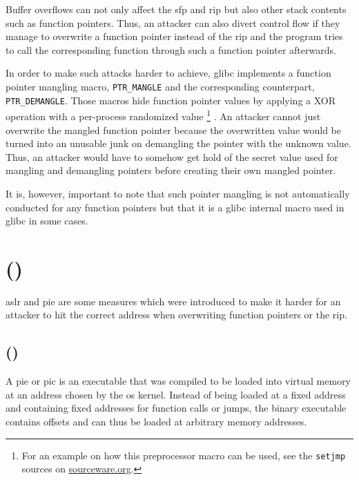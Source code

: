 Buffer overflows can not only affect the \acrfull{sfp} and \acrfull{rip} but also other stack contents such as function pointers.
Thus, an attacker can also divert control flow if they manage to overwrite a function pointer instead of the \gls{rip} and the program tries to call the corresponding function through such a function pointer afterwards.

In order to make such attacks harder to achieve, \gls{glibc} implements a function pointer mangling macro, \texttt{PTR\_MANGLE} and the corresponding counterpart, \texttt{PTR\_DEMANGLE}.
Those macros hide function pointer values by applying a XOR operation with a per-process randomized value%
	\footnote{For an example on how this preprocessor macro can be used, see the \texttt{setjmp} sources on \href{https://sourceware.org/git/?p=glibc.git;a=blob;f=sysdeps/x86_64/setjmp.S;h=b4e05e0f0c1bb2184cf872a6a26eb18de6cfeba1;hb=9ea3686266dca3f004ba874745a4087a89682617}{sourceware.org}.}
\cite{Newton2013}.
An attacker cannot just overwrite the mangled function pointer because the overwritten value would be turned into an unusable junk on demangling the pointer with the unknown value.
Thus, an attacker would have to somehow get hold of the secret value used for mangling and demangling pointers before creating their own mangled pointer.

It is, however, important to note that such pointer mangling is not automatically conducted for any function pointers but that it is a \gls{glibc} internal macro used in \gls{glibc} in some cases.

\section{ ()}
\label{sec:aslr-and-pie}

\gls{aslr} and \acrfull{pie} are some measures which were introduced to make it harder for an attacker to hit the correct address when overwriting function pointers or the \gls{rip}.

\subsection{ ()}
\label{subsec:position-independent-executable}

A \gls{pie} or \gls{pic} is an executable that was compiled to be loaded into virtual memory at an address chosen by the \gls{os} kernel.
Instead of being loaded at a fixed address and containing fixed addresses for function calls or jumps, the binary executable contains offsets and can thus be loaded at arbitrary memory addresses.

